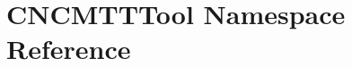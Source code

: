 \hypertarget{namespaceCNCMTTTool}{\section{C\-N\-C\-M\-T\-T\-Tool Namespace Reference}
\label{namespaceCNCMTTTool}
}
